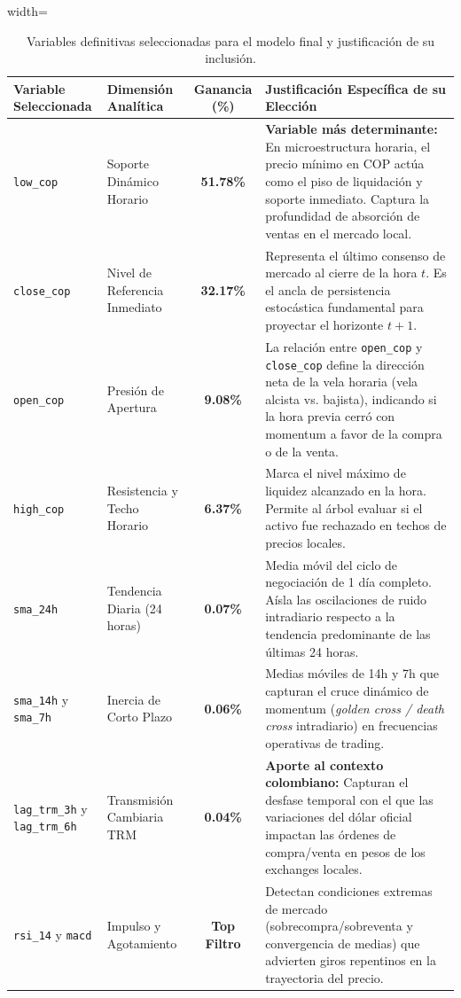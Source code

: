 \documentclass[12pt,letterpaper]{article}
\begin{document}
\begin{table}[H]
\centering
\caption{Variables definitivas seleccionadas para el modelo final y justificación de su inclusión.}
\label{tab:selected_features}
\begin{adjustbox}{width=\textwidth}
\begin{tabular}{lp{3.5cm}cp{7.5cm}}
\toprule
\textbf{Variable Seleccionada} & \textbf{Dimensión Analítica} & \textbf{Ganancia (\%)} & \textbf{Justificación Específica de su Elección} \\
\midrule
\texttt{low\_cop} & Soporte Dinámico Horario & \textbf{51.78\%} & \textbf{Variable más determinante:} En microestructura horaria, el precio mínimo en COP actúa como el piso de liquidación y soporte inmediato. Captura la profundidad de absorción de ventas en el mercado local. \\
\midrule
\texttt{close\_cop} & Nivel de Referencia Inmediato & \textbf{32.17\%} & Representa el último consenso de mercado al cierre de la hora $t$. Es el ancla de persistencia estocástica fundamental para proyectar el horizonte $t+1$. \\
\midrule
\texttt{open\_cop} & Presión de Apertura & \textbf{9.08\%} & La relación entre \texttt{open\_cop} y \texttt{close\_cop} define la dirección neta de la vela horaria (vela alcista vs. bajista), indicando si la hora previa cerró con momentum a favor de la compra o de la venta. \\
\midrule
\texttt{high\_cop} & Resistencia y Techo Horario & \textbf{6.37\%} & Marca el nivel máximo de liquidez alcanzado en la hora. Permite al árbol evaluar si el activo fue rechazado en techos de precios locales. \\
\midrule
\texttt{sma\_24h} & Tendencia Diaria (24 horas) & \textbf{0.07\%} & Media móvil del ciclo de negociación de 1 día completo. Aísla las oscilaciones de ruido intradiario respecto a la tendencia predominante de las últimas 24 horas. \\
\midrule
\texttt{sma\_14h} y \texttt{sma\_7h} & Inercia de Corto Plazo & \textbf{0.06\%} & Medias móviles de 14h y 7h que capturan el cruce dinámico de momentum (\textit{golden cross / death cross} intradiario) en frecuencias operativas de trading. \\
\midrule
\texttt{lag\_trm\_3h} y \texttt{lag\_trm\_6h} & Transmisión Cambiaria TRM & \textbf{0.04\%} & \textbf{Aporte al contexto colombiano:} Capturan el desfase temporal con el que las variaciones del dólar oficial impactan las órdenes de compra/venta en pesos de los exchanges locales. \\
\midrule
\texttt{rsi\_14} y \texttt{macd} & Impulso y Agotamiento & \textbf{Top Filtro} & Detectan condiciones extremas de mercado (sobrecompra/sobreventa y convergencia de medias) que advierten giros repentinos en la trayectoria del precio. \\
\bottomrule
\end{tabular}
\end{adjustbox}
\end{table}
\end{document}
